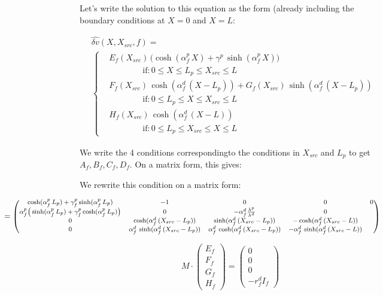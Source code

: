 \documentclass[colorlinks]{article}
\begin{document}
\begin{enumerate}
Let's write the solution to this equation as the form (already
including the boundary conditions at $X=0$ and $X=L$:

\begin{equation}
\begin{split}
& \hat{\delta v}(X, X_{src}, f) = \\
&\left\{
\begin{split}
& E_f(X_{src}) \, \big ( \cosh(\alpha_f^p \, X)+\gamma^p \, \sinh(\alpha_f^p \, X) \big) \\
& \qquad \qquad \mathrm{ if: } 0 \leq X \leq L_p \leq X_{src} \leq L \\
& F_f(X_{src})\, \cosh(\alpha_f^d \, (X-L_p))+G_f(X_{src})\, \sinh(\alpha_f^d \, (X-L_p)) \\
& \qquad \qquad \mathrm{ if: } 0  \leq L_p  \leq X \leq X_{src} \leq L \\
& H_f(X_{src}) \, \cosh(\alpha_f^d \, (X-L) )  \\
& \qquad \qquad \mathrm{ if: } 0  \leq L_p \leq X_{src}  \leq X \leq L 
\end{split}
\right.
\end{split}
\end{equation}

We write the 4 conditions correspondingto the conditions in $X_{src}$
and $L_p$ to get $A_f, B_f, C_f, D_f$. On a matrix form, this gives:

We rewrite this condition on a matrix form:

\begin{equation}
\hspace{-4cm}
\footnotesize
M_2 = 
\begin{pmatrix}
    \cosh(\alpha_f^p \, L_p)+\gamma_f^p \sinh(\alpha_f^p \, L_p) & -1 & 0 &0 & 0 \\
    \alpha_f^p \big ( \sinh(\alpha_f^p \, L_p)+\gamma_f^p \cosh(\alpha_f^p \, L_p)  \big) 
         & 0 & -  \alpha_f^d \frac{\lambda^p}{\lambda^d} & 0 \\
    0 & \cosh(\alpha_f^d \, (X_{src}-L_p)) & \sinh(\alpha_f^d \, (X_{src}-L_p)) & - \cosh(\alpha_f^d \, (X_{src}-L))\\
    0 & \alpha_f^d \, \sinh(\alpha_f^d \, (X_{src}-L_p)) & \alpha_f^d \, \cosh(\alpha_f^d \, (X_{src}-L_p))
         & - \alpha_f^d \, \sinh(\alpha_f^d \, (X_{src}-L))\\
\end{pmatrix}
\end{equation}

\begin{equation}
M \cdot
\begin{pmatrix}
    E_f \\
    F_f \\
    G_f \\
    H_f
\end{pmatrix} = 
\begin{pmatrix}
0 \\
0 \\
0 \\
- r_f^d I_f
\end{pmatrix}
\end{equation}


\end{enumerate}
\end{document}
